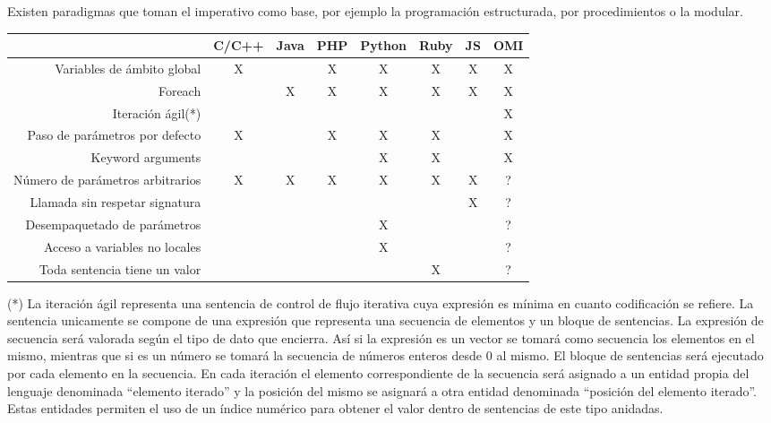 Existen paradigmas que toman el imperativo como base, por ejemplo la programación
estructurada, por procedimientos o la modular. 


\FloatBarrier
\begin{table}[h]
\begin{center}
 
\begin{tabular}{|r|c|c|c|c|c|c|c|} \hline
 & C/C++ & Java &  PHP  & Python & Ruby & JS & OMI\\ \hline
Variables de ámbito global  & X &  & X & X & X & X & X \\ \hline
Foreach & & X & X & X & X & X & X \\ \hline
Iteración ágil(*) & &  & &  &  &  & X \\ \hline
Paso de parámetros por defecto & X &  & X & X & X & & X  \\ \hline
Keyword arguments & & &  & X & X & & X  \\ \hline
Número de parámetros arbitrarios & X & X & X & X & X & X & ?  \\ \hline
Llamada sin respetar signatura  &  &  &  &  &  & X & ?  \\ \hline
Desempaquetado de parámetros & & & & X & & & ? \\ \hline
Acceso a variables no locales & & & & X & & & ? \\ \hline
Toda sentencia tiene un valor & & & & & X & & ? \\ \hline
\end{tabular}
\end{center}
\end{table}
\FloatBarrier

(*) La iteración ágil representa una sentencia de control de flujo iterativa 
cuya expresión es mínima en cuanto codificación se refiere. La 
sentencia unicamente se compone de una expresión que representa una secuencia de elementos
y un bloque de sentencias. La expresión de secuencia será valorada según el tipo de dato
que encierra. Así si la expresión es un vector se tomará como 
secuencia los elementos en el mismo, mientras que si es un número se 
tomará la secuencia de números enteros desde 0 al mismo. El bloque de 
sentencias será ejecutado por cada elemento en la secuencia. En cada iteración 
el elemento correspondiente de la secuencia será asignado a un entidad propia del 
lenguaje denominada ``elemento iterado'' y la posición del mismo se asignará a 
otra entidad denominada ``posición del elemento iterado''. Estas entidades permiten el uso 
de un índice numérico para obtener el valor dentro de sentencias de este tipo anidadas. 

